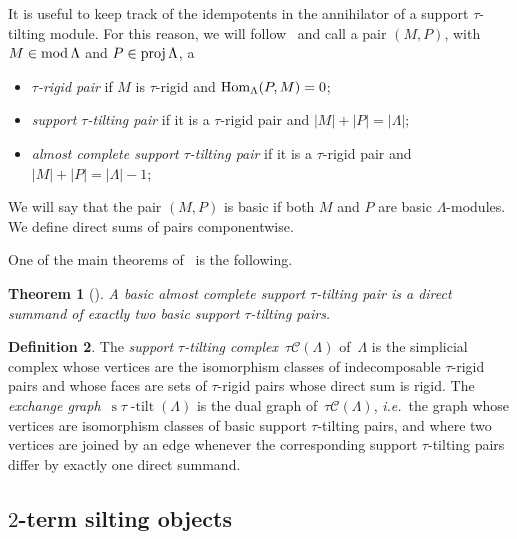\documentclass{amsart}
\newtheorem{theorem}{Theorem}%
\theoremstyle{definition}
\newtheorem{definition}[theorem]{Definition}
\newcommand{\ie}{\textit{i.e.}~} %
\newcommand{\darkblue}{\color{darkblue}} %
\newcommand{\defn}[1]{\textsl{\darkblue #1}} %
\newcommand{\stau}{\operatorname{s} \! \tau \! \operatorname{-tilt}}
\newcommand{\tiltingComplex}{\tau\mathcal{C}}
\newcommand{\MOD}{\mbox{{\rm mod \!}}}
\newcommand{\proj}{\operatorname{{\rm proj }}}
\newcommand{\Hom}[1]{\operatorname{{\rm Hom}}_{#1}}
\begin{document}
It is useful to keep track of the idempotents in the annihilator of a support $\tau$-tilting module.
For this reason, we will follow~\cite[Def.~0.3]{AdachiIyamaReiten} and call a pair $(M,P)$, with $M\in \MOD \Lambda$ and $P\in \proj \Lambda$, a
\begin{itemize}
 \item \defn{$\tau$-rigid pair} if $M$ is $\tau$-rigid and $\Hom{\Lambda}(P,M) = 0$;
 \item \defn{support $\tau$-tilting pair} if it is a $\tau$-rigid pair and $|M| + |P| = |\Lambda|$;
 \item \defn{almost complete support $\tau$-tilting pair} if it is a $\tau$-rigid pair and $|M| + |P| = |\Lambda|-1$;
\end{itemize}
We will say that the pair $(M,P)$ is basic if both $M$ and $P$ are basic $\Lambda$-modules.  
We define direct sums of pairs componentwise.

One of the main theorems of~\cite{AdachiIyamaReiten} is the following.

\begin{theorem}[{\cite[Thm.~0.4]{AdachiIyamaReiten}}]
 A basic almost complete support $\tau$-tilting pair is a direct summand of exactly two basic support $\tau$-tilting pairs.
\end{theorem}

\begin{definition}
The \defn{support $\tau$-tilting complex}~$\tiltingComplex(\Lambda)$ of~$\Lambda$ is the simplicial complex whose vertices are the isomorphism classes of indecomposable $\tau$-rigid pairs and whose faces are sets of $\tau$-rigid pairs whose direct sum is rigid.
The \defn{exchange graph}~$\stau(\Lambda)$ is the dual graph of~$\tiltingComplex(\Lambda)$, \ie the graph whose vertices are isomorphism classes of basic support $\tau$-tilting pairs, and where two vertices are joined by an edge whenever the corresponding support $\tau$-tilting pairs differ by exactly one direct summand.
\end{definition}


\subsection{$2$-term silting objects}
\end{document}
